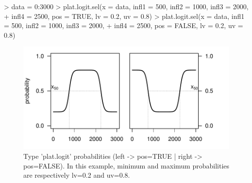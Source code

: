 \documentclass[letterpaper, 12pt]{article}
\begin{document}
\begin{Schunk}
\begin{Sinput}
> data = 0:3000
> plat.logit.sel(x = data, infl1 = 500, infl2 = 1000, infl3 = 2000, 
+     infl4 = 2500, pos = TRUE, lv = 0.2, uv = 0.8)
> plat.logit.sel(x = data, infl1 = 500, infl2 = 1000, infl3 = 2000, 
+     infl4 = 2500, pos = FALSE, lv = 0.2, uv = 0.8)
\end{Sinput}
\end{Schunk}
\begin{figure}[h]
\vspace{-20pt}
\begin{center}
\includegraphics{relation_sel-031}
\end{center}
\vspace{-30pt}
\caption{Type 'plat.logit' probabilities (left -> pos=TRUE |  right -> pos=FALSE). In this example, minimum and maximum probabilities are respectively lv=0.2 and uv=0.8.}
\vspace{-20pt}
\label{fig15}
\end{figure}
\end{document}
